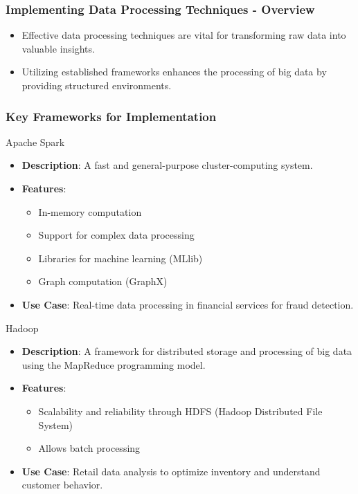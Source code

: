 \documentclass[aspectratio=169]{beamer}
\begin{document}
\begin{frame}[fragile]
    \frametitle{Implementing Data Processing Techniques - Overview}
    \begin{itemize}
        \item Effective data processing techniques are vital for transforming raw data into valuable insights.
        \item Utilizing established frameworks enhances the processing of big data by providing structured environments.
    \end{itemize}
\end{frame}

\begin{frame}[fragile]
    \frametitle{Key Frameworks for Implementation}
    \begin{block}{Apache Spark}
        \begin{itemize}
            \item \textbf{Description}: A fast and general-purpose cluster-computing system.
            \item \textbf{Features}: 
            \begin{itemize}
                \item In-memory computation
                \item Support for complex data processing
                \item Libraries for machine learning (MLlib)
                \item Graph computation (GraphX)
            \end{itemize}
            \item \textbf{Use Case}: Real-time data processing in financial services for fraud detection.
        \end{itemize}
    \end{block}

    \begin{block}{Hadoop}
        \begin{itemize}
            \item \textbf{Description}: A framework for distributed storage and processing of big data using the MapReduce programming model.
            \item \textbf{Features}:
            \begin{itemize}
                \item Scalability and reliability through HDFS (Hadoop Distributed File System)
                \item Allows batch processing
            \end{itemize}
            \item \textbf{Use Case}: Retail data analysis to optimize inventory and understand customer behavior.
        \end{itemize}
    \end{block}
\end{frame}
\end{document}
